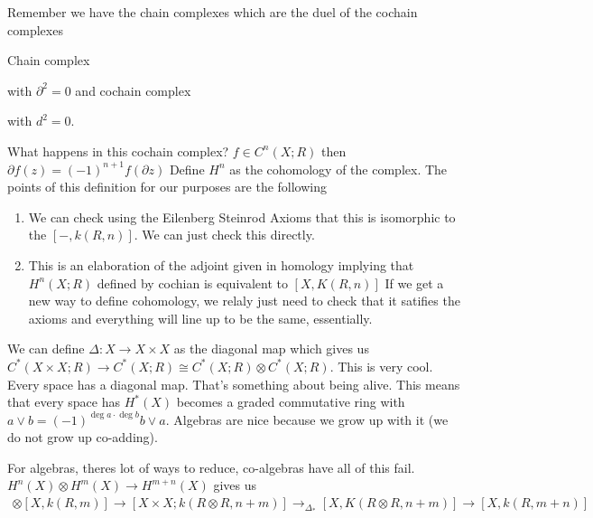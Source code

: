 \documentclass[12pt]{article}
\theoremstyle{definition}
\begin{document}
	Remember we have the chain complexes which are the duel of the cochain complexes\begin{center} Chain complex
		with $\partial^2=0$ and cochain complex 
		with $d^2=0$. 
	\end{center}
	What happens in this cochain complex? $f\in C^n(X;R)$ then $\partial f(z)=(-1)^{n+1}f(\partial z)$ Define $H^n$ as the cohomology of the complex. The points of this definition for our purposes are the following\begin{enumerate}
		\item We can check using the Eilenberg Steinrod Axioms that this is isomorphic to the $[-,k(R,n)]$. We can just check this directly.
		\item This is an elaboration of the adjoint given in homology implying that $H^n(X;R)$ defined by cochian is equivalent to $[X,K(R,n)]$ If we get a new way to define cohomology, we relaly just need to check that it satifies the axioms and everything will line up to be the same, essentially. 
	\end{enumerate}
	We can define $\Delta:X\to X\times X$ as the diagonal map which gives us $C^\ast(X\times X; R)\to C^\ast(X;R)\cong C^\ast(X;R)\otimes C^\ast (X;R)$. This is very cool. Every space has a diagonal map. That's something about being alive. This means that every space has $H^*(X)$ becomes a graded commutative ring with $a\vee b=(-1)^{\deg a\cdot \deg b} b\vee a$. Algebras are nice because we grow up with it (we do not grow up co-adding). 
	
	For algebras, theres lot of ways to reduce, co-algebras have all of this fail. $H^n(X)\otimes H^m(X)\to H^{m+n}(X)$ gives us \begin{align*}
	[X,k(R,n)]\otimes [X,k(R,m)]\to [X\times X; k(R\otimes R,n+m)]\to_{\Delta_\ast} [X,K(R\otimes R, n+m)]\to [X,k(R,m+n)]
	\end{align*}
\end{document}
